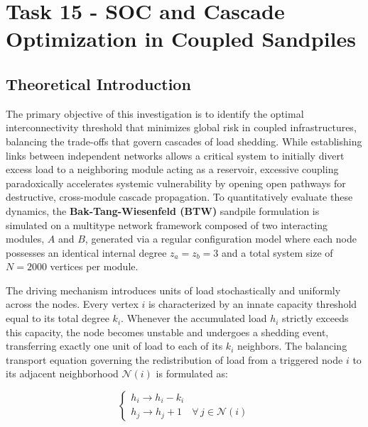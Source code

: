 \chapter{Task 15 - SOC and Cascade Optimization in Coupled Sandpiles}
\label{ch:task15}

\section{Theoretical Introduction}

The primary objective of this investigation is to identify the optimal interconnectivity threshold that minimizes global risk in coupled infrastructures, balancing the trade-offs that govern cascades of load shedding.\cite{brummitt2012suppressing} While establishing links between independent networks allows a critical system to initially divert excess load to a neighboring module acting as a reservoir, excessive coupling paradoxically accelerates systemic vulnerability by opening open pathways for destructive, cross-module cascade propagation.\cite{brummitt2012suppressing} To quantitatively evaluate these dynamics, the \textbf{Bak-Tang-Wiesenfeld (BTW)} sandpile formulation is simulated on a multitype network framework composed of two interacting modules, $A$ and $B$, generated via a regular configuration model where each node possesses an identical internal degree $z_a = z_b = 3$ and a total system size of $N = 2000$ vertices per module.\cite{brummitt2012suppressing}

The driving mechanism introduces units of load stochastically and uniformly across the nodes.\cite{brummitt2012suppressing} Every vertex $i$ is characterized by an innate capacity threshold equal to its total degree $k_i$.\cite{brummitt2012suppressing} Whenever the accumulated load $h_i$ strictly exceeds this capacity, the node becomes unstable and undergoes a shedding event, transferring exactly one unit of load to each of its $k_i$ neighbors.\cite{brummitt2012suppressing} The balancing transport equation governing the redistribution of load from a triggered node $i$ to its adjacent neighborhood $\mathcal{N}(i)$ is formulated as:\cite{bak1987self}

\begin{equation}\label{eq:load_shedding_flow}
    \begin{cases}
        h_i \longrightarrow h_i - k_i \\
        h_j \longrightarrow h_j + 1 & \forall \, j \in \mathcal{N}(i)
    \end{cases}
\end{equation}

